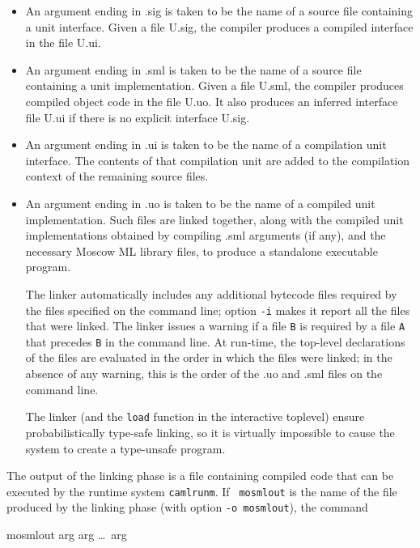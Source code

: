 \documentclass[fleqn,a4paper]{article}
\begin{document}
\begin{itemize}
\item An argument ending in .sig is taken to be the name of a source
  file containing a unit interface.  Given a file U.sig, the compiler
  produces a compiled interface in the file U.ui.
  
\item An argument ending in .sml is taken to be the name of a source
  file containing a unit implementation.  Given a file U.sml, the
  compiler produces compiled object code in the file U.uo.  It also
  produces an inferred interface file U.ui if there is no explicit
  interface U.sig.
  
\item An argument ending in .ui is taken to be the name of a
  compilation unit interface.  The contents of that compilation unit
  are added to the compilation context of the remaining source files.
  
\item An argument ending in .uo is taken to be the name of a compiled
  unit implementation.  Such files are linked together, along with the
  compiled unit implementations obtained by compiling .sml arguments
  (if any), and the necessary Moscow ML library files, to produce a
  standalone executable program.
  
  The linker automatically includes any additional bytecode files
  required by the files specified on the command line; option {\tt -i}
  makes it report all the files that were linked.  The linker issues a
  warning if a file {\tt B} is required by a file {\tt A} that
  precedes {\tt B} in the command line.  At run-time, the top-level
  declarations of the files are evaluated in the order in which the
  files were linked; in the absence of any warning, this is the order
  of the .uo and .sml files on the command line.
  
  The linker (and the {\tt load} function in the interactive toplevel)
  ensure probabilistically type-safe linking, so it is virtually
  impossible to cause the system to create a type-unsafe program.
\end{itemize}

\noindent 
The output of the linking phase is a file containing compiled code
that can be executed by the runtime system {\tt camlrunm}.  If {\tt
  mosmlout} is the name of the file produced by the linking phase
(with option \texttt{-o mosmlout}), the command

\begin{program}
mosmlout arg arg \ldots\ arg
\end{program}
\end{document}
